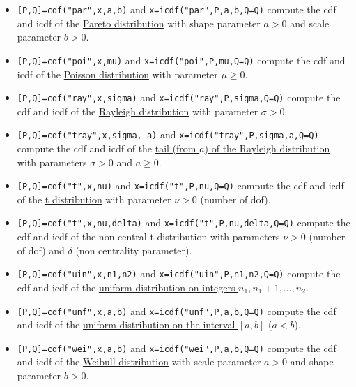 \begin{mandescription}
\begin{itemize}
\item {} \verb![P,Q]=cdf("par",x,a,b)! and  \verb!x=icdf("par",P,a,b,Q=Q)! compute the
cdf and icdf of the \hyperlink{parpdf}{Pareto  distribution} with shape parameter $a > 0$ and scale parameter $b > 0$.

\item {} \verb![P,Q]=cdf("poi",x,mu)! and \verb!x=icdf("poi",P,mu,Q=Q)! compute the
cdf and icdf of the \hyperlink{poipdf}{Poisson distribution} with parameter $\mu \ge 0$.


\item {} \verb![P,Q]=cdf("ray",x,sigma)! and \verb!x=icdf("ray",P,sigma,Q=Q)! compute
the cdf and icdf of the \hyperlink{raypdf}{Rayleigh distribution} with parameter $\sigma > 0$.

\item {} \verb![P,Q]=cdf("tray",x,sigma, a)! and \verb!x=icdf("tray",P,sigma,a,Q=Q)! compute
the cdf and icdf of the \hyperlink{traypdf}{tail (from $a$) of the Rayleigh distribution} with parameters $\sigma > 0$ 
and $a \ge 0$.

\item {} \verb![P,Q]=cdf("t",x,nu)! and \verb!x=icdf("t",P,nu,Q=Q)! compute the
cdf and icdf of the \hyperlink{tpdf}{t distribution} with parameter $\nu > 0$ (number of dof).


\item {} \verb![P,Q]=cdf("t",x,nu,delta)! and \verb!x=icdf("t",P,nu,delta,Q=Q)! compute the
cdf and icdf of the non central t distribution with parameters $\nu > 0$ (number of dof) and
$\delta$ (non centrality parameter).


\item {} \verb![P,Q]=cdf("uin",x,n1,n2)! and \verb!x=icdf("uin",P,n1,n2,Q=Q)! compute
the cdf and icdf of the \hyperlink{uinpdf}{uniform distribution on integers $n_1,n_1+1,\dots,n_2$}.

\item {} \verb![P,Q]=cdf("unf",x,a,b)!  and \verb!x=icdf("unf",P,a,b,Q=Q)! compute
the cdf and icdf of the \hyperlink{unfpdf}{uniform distribution on the interval $[a,b]$} ($a < b$).

\item {} \verb![P,Q]=cdf("wei",x,a,b)! and \verb!x=icdf("wei",P,a,b,Q=Q)! compute the
cdf and icdf of the \hyperlink{weipdf}{Weibull  distribution} with scale parameter $a > 0$ and shape parameter 
$b > 0$.

\end{itemize}

\end{mandescription}


